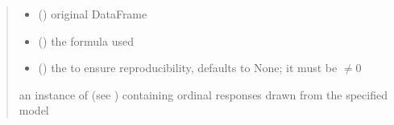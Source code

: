 \documentclass[letterpaper,10pt,english]{sphinxmanual}
\begin{document}
\begin{fulllineitems}
\begin{quote}
\begin{description}
\begin{itemize}
\item {} 
\sphinxAtStartPar
{} () \textendash{} original DataFrame

\item {} 
\sphinxAtStartPar
{} () \textendash{} the formula used

\item {} 
\sphinxAtStartPar
{} (\sphinxstyleliteralemphasis{\sphinxupquote{, }}) \textendash{} the  to ensure reproducibility, defaults to None;
it must be \(\neq 0\)

\end{itemize}

\sphinxAtStartPar
an instance of  (see ) containing ordinal responses drawn from the specified model

\end{description}\end{quote}

\end{fulllineitems}

\end{document}
